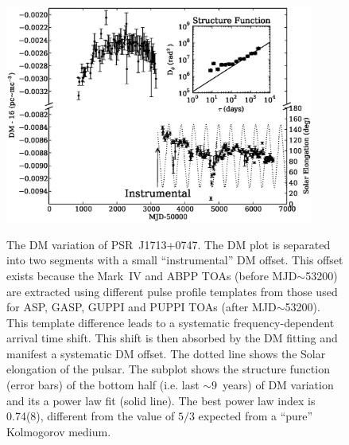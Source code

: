\documentclass[12pt,preprint]{aastex}
\begin{document}
\begin{figure}
\includegraphics[width=4in]{DMX.ps} \\ 
\caption {\label{fig:dmx} The DM variation of PSR~J1713+0747. The DM plot is
separated into two segments with a small ``instrumental'' DM offset. This offset exists 
because the Mark~IV and ABPP TOAs (before MJD$\sim$53200) are extracted using
different pulse
profile templates from those used for ASP, GASP, GUPPI and PUPPI TOAs (after
MJD$\sim$53200). This template difference leads to a systematic
frequency-dependent arrival time shift. This shift is then absorbed by the DM
fitting and manifest a systematic DM offset. The dotted line shows the Solar
elongation of the pulsar. The subplot shows the structure
function (error bars) of the bottom half (i.e. last $\sim 9$~years) of DM
variation and its a power law fit (solid line). The best power law index is
0.74(8), different from the value of $5/3$ expected from a
``pure'' Kolmogorov medium. } 
\end{figure} 

\end{document}
